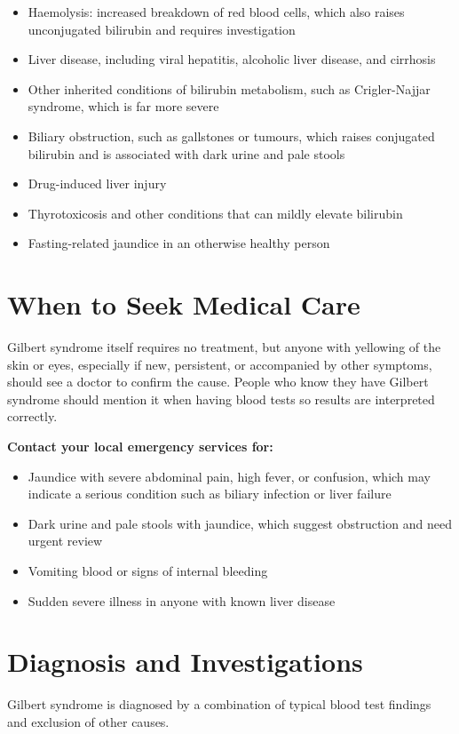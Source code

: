 \begin{itemize}
    \item Haemolysis: increased breakdown of red blood cells, which also raises unconjugated bilirubin and requires investigation
    \item Liver disease, including viral hepatitis, alcoholic liver disease, and cirrhosis
    \item Other inherited conditions of bilirubin metabolism, such as Crigler-Najjar syndrome, which is far more severe
    \item Biliary obstruction, such as gallstones or tumours, which raises conjugated bilirubin and is associated with dark urine and pale stools
    \item Drug-induced liver injury
    \item Thyrotoxicosis and other conditions that can mildly elevate bilirubin
    \item Fasting-related jaundice in an otherwise healthy person
\end{itemize}

\section*{When to Seek Medical Care}
Gilbert syndrome itself requires no treatment, but anyone with yellowing of the skin or eyes, especially if new, persistent, or accompanied by other symptoms, should see a doctor to confirm the cause. People who know they have Gilbert syndrome should mention it when having blood tests so results are interpreted correctly.

\textbf{Contact your local emergency services for:}
\begin{itemize}
    \item Jaundice with severe abdominal pain, high fever, or confusion, which may indicate a serious condition such as biliary infection or liver failure
    \item Dark urine and pale stools with jaundice, which suggest obstruction and need urgent review
    \item Vomiting blood or signs of internal bleeding
    \item Sudden severe illness in anyone with known liver disease
\end{itemize}

\section*{Diagnosis and Investigations}
Gilbert syndrome is diagnosed by a combination of typical blood test findings and exclusion of other causes.

